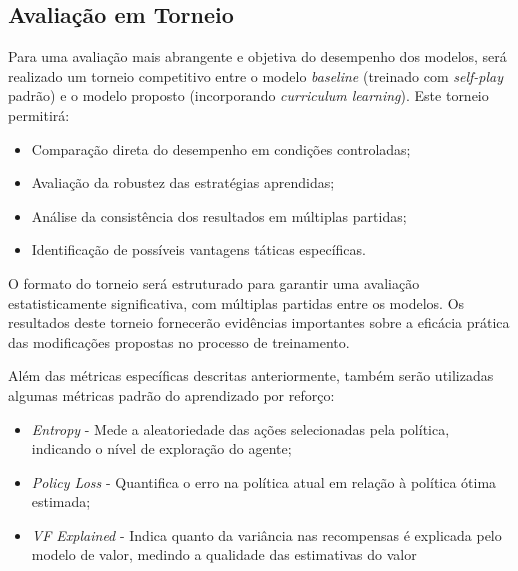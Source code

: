 \subsection{Avaliação em Torneio}

Para uma avaliação mais abrangente e objetiva do desempenho dos modelos, será realizado um torneio competitivo entre o modelo \textit{baseline} (treinado com \textit{self-play} padrão) e o modelo proposto (incorporando \textit{curriculum learning}). Este torneio permitirá:

\begin{itemize}
    \item Comparação direta do desempenho em condições controladas;
    \item Avaliação da robustez das estratégias aprendidas;
    \item Análise da consistência dos resultados em múltiplas partidas;
    \item Identificação de possíveis vantagens táticas específicas.
\end{itemize}

O formato do torneio será estruturado para garantir uma avaliação estatisticamente significativa, com múltiplas partidas entre os modelos. Os resultados deste torneio fornecerão evidências importantes sobre a eficácia prática das modificações propostas no processo de treinamento.


Além das métricas específicas descritas anteriormente, também serão utilizadas algumas métricas padrão do aprendizado por reforço:

\begin{itemize}
    \item \textit{Entropy} - Mede a aleatoriedade das ações selecionadas pela política, indicando o nível de exploração do agente;
    \item \textit{Policy Loss} - Quantifica o erro na política atual em relação à política ótima estimada;
    \item \textit{VF Explained} - Indica quanto da variância nas recompensas é explicada pelo modelo de valor, medindo a qualidade das estimativas do valor
\end{itemize}


